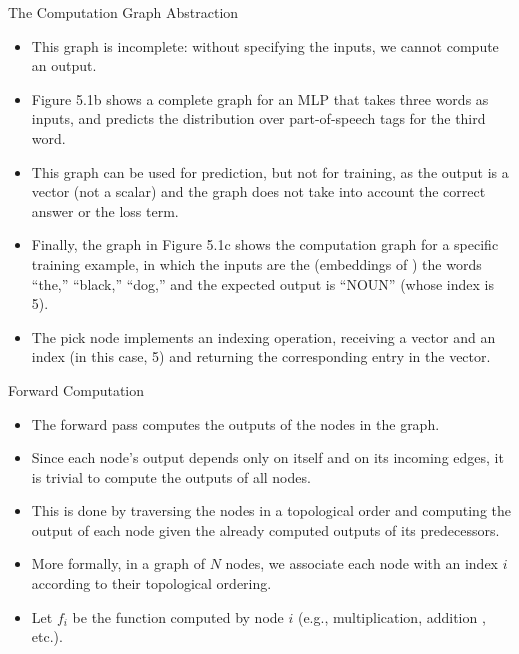 \documentclass[handout]{beamer}
\begin{document}
\begin{frame}{The Computation Graph Abstraction}
\begin{scriptsize}
\begin{itemize}

\item This graph is incomplete: without specifying the inputs, we cannot compute an output.

\item Figure 5.1b shows a complete graph for an MLP that takes three words as inputs, and predicts the distribution over part-of-speech tags for the third word. 

\item This graph can be used for prediction, but not for training, as the output is a vector (not a scalar) and the graph does not take into account
the correct answer or the loss term. 

\item Finally, the graph in Figure 5.1c shows the computation graph for a specific training example, in which the inputs are the (embeddings of ) the words ``the,'' ``black,'' ``dog,'' and the expected output is ``NOUN'' (whose index is 5). 

\item The pick node implements an indexing operation, receiving a vector and an index (in this case, 5) and returning  the corresponding entry in the vector.


\end{itemize}
\end{scriptsize}
\end{frame}



\begin{frame}{Forward Computation}
\begin{scriptsize}
\begin{itemize}

\item  The forward pass computes the outputs of the nodes in the graph. \item Since each node's output depends only on itself and on its incoming edges, it is trivial to compute the outputs of all nodes.

\item This is done by traversing the nodes in a topological order and computing the output of each node given the already computed outputs of its predecessors.

\item  More formally, in a graph of $N$ nodes, we associate each node with an index $i$ according to their topological ordering.

\item Let $f_i$ be the function computed by node $i$ (e.g., multiplication,
addition , etc.).



\end{itemize}
\end{scriptsize}
\end{frame}
\end{document}
